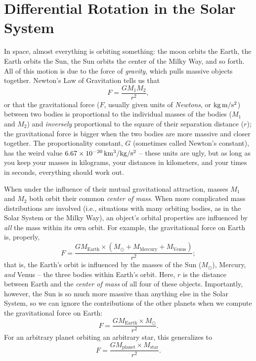 \documentclass[11pt]{article}%
\begin{document}
\section{Differential Rotation in the Solar System}
\noindent
In space, almost everything is orbiting something: the moon orbits the Earth, the Earth orbits the Sun, the Sun orbits the center of the Milky Way, and so forth. All of this motion is due to the force of \emph{gravity}, which pulls massive objects together. Newton's Law of Gravitation tells us that
\begin{equation}
F = \frac{G M_1 M_2}{r^2},
\end{equation}
or that the gravitational force ($F$, usually given units of \emph{Newtons}, or $\rm kg \, m/s^2$) between two bodies is proportional to the individual masses of the bodies ($M_1$ and $M_2$) and \emph{inversely} proportional to the square of their separation distance ($r$); the gravitational force is bigger when the two bodies are more massive and closer together. The proportionality constant, $G$ (sometimes called Newton's constant), has the weird value $6.67 \times 10^{-20} \, {\rm km^3/kg/s^2}$ -- these units are ugly, but as long as you keep your masses in kilograms, your distances in kilometers, and your times in seconds, everything should work out.


When under the influence of their mutual gravitational attraction, masses $M_1$ and $M_2$ both orbit their common \emph{center of mass}. When more complicated mass distributions are involved (i.e., situations with many orbiting bodies, as in the Solar System or the Milky Way), an object's orbital properties are influenced by  \emph{all} the mass within its own orbit. For example, the gravitational force on Earth is, properly,
\begin{equation}
F = \frac{G M_{\textrm{Earth}} \times (M_{\odot} + M_{\textrm{Mercury}} + M_{\textrm{Venus}})}{r^2};
\end{equation}
that is, the Earth's orbit is influenced by the masses of the Sun ($M_\odot$), Mercury, \emph{and} Venus -- the three bodies within Earth's orbit. Here, $r$ is the distance between Earth and the \emph{center of mass} of all four of these objects. Importantly, however, the Sun is so much more massive than anything else in the Solar System, so we can ignore the contributions of the other planets when we compute the gravitational force on Earth:
\begin{equation}
F = \frac{G M_{\textrm{Earth}} \times M_{\odot}}{r^2}.
\end{equation}
For an arbitrary planet orbiting an arbitrary star, this generalizes to
\begin{equation} \label{eq:grav}
F = \frac{G M_{\textrm{planet}} \times M_{\textrm{star}}}{r^2}.
\end{equation}
\end{document}
